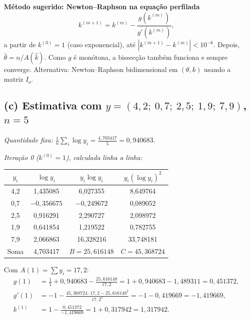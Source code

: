 \documentclass[11pt,a4paper]{article}
\theoremstyle{definition}
\theoremstyle{plain}
\begin{document}
\begin{resposta}
\textbf{Método sugerido: Newton--Raphson na equação perfilada}
\[
k^{(m+1)}=k^{(m)}-\frac{g(k^{(m)})}{g'(k^{(m)})},
\]
a partir de $k^{(0)}=1$ (caso exponencial), até $|k^{(m+1)}-k^{(m)}|<10^{-6}$. Depois, $\hat\theta=n/A(\hat k)$. Como $g$ é monótona, a bissecção também funciona e sempre converge. Alternativa: Newton--Raphson bidimensional em $(\theta,k)$ usando a matriz $I_o$.
\end{resposta}

\subsection*{(c) Estimativa com $y=(4{,}2;\ 0{,}7;\ 2{,}5;\ 1{,}9;\ 7{,}9)$, $n=5$}
\textit{Quantidade fixa:} $\frac1n\sum_i\log y_i=\frac{4{,}703417}{5}=0{,}940683$.

\textit{Iteração 0 ($k^{(0)}=1$), calculada linha a linha:}
\begin{center}
\begin{tabular}{@{}cccc@{}}
\toprule
$y_i$ & $\log y_i$ & $y_i\log y_i$ & $y_i(\log y_i)^2$\\
\midrule
4,2 & 1,435085 & 6,027355 & 8,649764\\
0,7 & $-0{,}356675$ & $-0{,}249672$ & 0,089052\\
2,5 & 0,916291 & 2,290727 & 2,098972\\
1,9 & 0,641854 & 1,219522 & 0,782755\\
7,9 & 2,066863 & 16,328216 & 33,748181\\
\midrule
Soma & 4,703417 & $B=25{,}616148$ & $C=45{,}368724$\\
\bottomrule
\end{tabular}
\end{center}
Com $A(1)=\sum y_i=17{,}2$:
\begin{align*}
g(1)&=\frac11+0{,}940683-\frac{25{,}616148}{17{,}2}=1+0{,}940683-1{,}489311=0{,}451372,\\
g'(1)&=-1-\frac{45{,}368724\cdot17{,}2-25{,}616148^2}{17{,}2^2}=-1-0{,}419669=-1{,}419669,\\
k^{(1)}&=1-\frac{0{,}451372}{-1{,}419669}=1+0{,}317942=1{,}317942 .
\end{align*}
\end{document}
